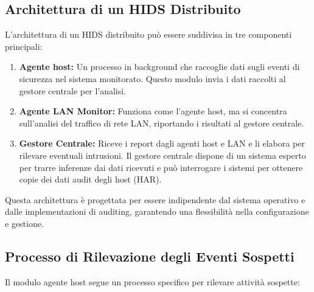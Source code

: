 \subsection{Architettura di un HIDS Distribuito}

L'architettura di un HIDS distribuito può essere suddivisa in tre componenti principali:

\begin{enumerate}
    \item \textbf{Agente host:} Un processo in background che raccoglie dati sugli eventi di sicurezza nel sistema monitorato. Questo modulo invia i dati raccolti al gestore centrale per l'analisi.
    
    \item \textbf{Agente LAN Monitor:} Funziona come l'agente host, ma si concentra sull'analisi del traffico di rete LAN, riportando i risultati al gestore centrale.
    
    \item \textbf{Gestore Centrale:} Riceve i report dagli agenti host e LAN e li elabora per rilevare eventuali intrusioni. Il gestore centrale dispone di un sistema esperto per trarre inferenze dai dati ricevuti e può interrogare i sistemi per ottenere copie dei dati audit degli host (HAR).
\end{enumerate}

Questa architettura è progettata per essere indipendente dal sistema operativo e dalle implementazioni di auditing, garantendo una flessibilità nella configurazione e gestione.

\subsection{Processo di Rilevazione degli Eventi Sospetti}

Il modulo agente host segue un processo specifico per rilevare attività sospette:

